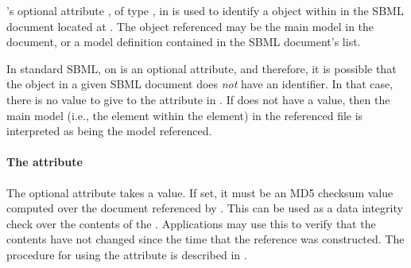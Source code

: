 \ExternalModelDefinition's optional attribute , of type
, in is used to identify a \Model object within in the
SBML document located at .  The object referenced may be
the main model in the document, or a model definition contained in the
SBML document's  list.

In standard SBML,  on \Model is an optional attribute, and
therefore, it is possible that the \Model object in a given SBML
document does \emph{not} have an identifier.  In that case, there is no
value to give to the attribute in \ExternalModelDefinition.
If  does not have a value, then the main model (i.e., the
 element within the  element) in the
referenced file is interpreted as being the model referenced.


\paragraph{The \hspace*{1pt} attribute}

The optional  attribute takes a  value.  If
set, it must be an MD5 checksum value computed over the document
referenced by .  This can be used as a data integrity
check over the contents of the .  Applications may use
this to verify that the contents have not changed since the time that
the \ExternalModelDefinition reference was constructed.  The procedure
for using the  attribute is described in
.

